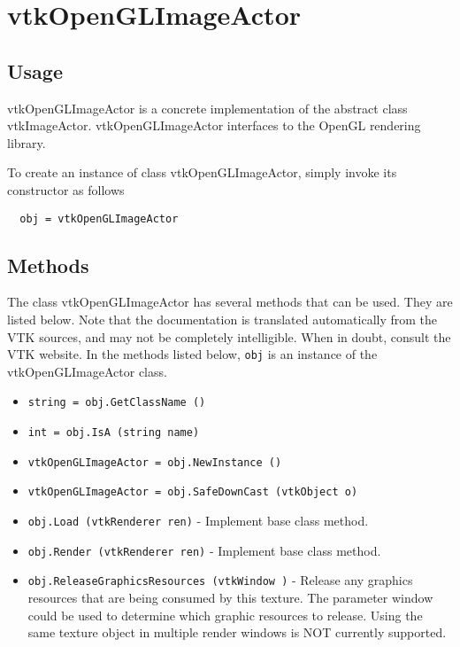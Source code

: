 \section{vtkOpenGLImageActor}

\subsection{Usage}

 vtkOpenGLImageActor is a concrete implementation of the abstract class 
 vtkImageActor. vtkOpenGLImageActor interfaces to the OpenGL rendering library.

To create an instance of class vtkOpenGLImageActor, simply
invoke its constructor as follows
\begin{verbatim}
  obj = vtkOpenGLImageActor
\end{verbatim}
\subsection{Methods}

The class vtkOpenGLImageActor has several methods that can be used.
  They are listed below.
Note that the documentation is translated automatically from the VTK sources,
and may not be completely intelligible.  When in doubt, consult the VTK website.
In the methods listed below, \verb|obj| is an instance of the vtkOpenGLImageActor class.
\begin{itemize}
\item  \verb|string = obj.GetClassName ()|

\item  \verb|int = obj.IsA (string name)|

\item  \verb|vtkOpenGLImageActor = obj.NewInstance ()|

\item  \verb|vtkOpenGLImageActor = obj.SafeDownCast (vtkObject o)|

\item  \verb|obj.Load (vtkRenderer ren)| -  Implement base class method.

\item  \verb|obj.Render (vtkRenderer ren)| -  Implement base class method.

\item  \verb|obj.ReleaseGraphicsResources (vtkWindow )| -  Release any graphics resources that are being consumed by this texture.
 The parameter window could be used to determine which graphic
 resources to release. Using the same texture object in multiple
 render windows is NOT currently supported. 

\end{itemize}
